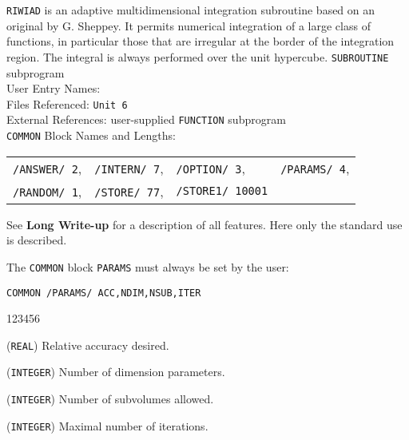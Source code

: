                      
                  
\Submitter{}                         
                     
\begin{center}
\end{center}
{\tt RIWIAD} is an adaptive multidimensional integration subroutine
based on an original by G. Sheppey. It permits numerical integration
of a large class of functions, in particular those that are irregular
at the border of the integration region. The integral is always
performed over the unit hypercube.
\Structure
{\tt SUBROUTINE} subprogram\\
User Entry Names: \\
Files Referenced: {\tt Unit 6}\\
External References: 
user-supplied {\tt FUNCTION} subprogram \\
{\tt COMMON} Block Names and Lengths: 
    \begin{tabular}[t]{@{}llll}
        \texttt{/ANSWER/ 2},   &\texttt{/INTERN/ 7},&
          \texttt {/OPTION/ 3},  &\texttt{/PARAMS/ 4}, \\
        \texttt{/RANDOM/ 1},   &\texttt{/STORE/ 77},&
           \texttt{/STORE1/ 10001} 
    \end{tabular}
\Usage
See {\bf Long Write-up} for a description of all features.
Here only the standard use is described.
\par
The {\tt COMMON} block {\tt PARAMS} must always
be set by the user:
\begin{center}
{\tt COMMON /PARAMS/ ACC,NDIM,NSUB,ITER}
\end{center}
\begin{DLtt}{123456}
\item [ACC] ({\tt REAL}) Relative accuracy desired.
\item [NDIM] ({\tt INTEGER}) Number of dimension parameters.
\item [NSUB] ({\tt INTEGER}) Number of subvolumes allowed.
\item [ITER] ({\tt INTEGER}) Maximal number of iterations.
\end{DLtt}
